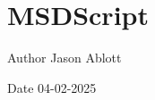 \chapter{MSDScript}
\hypertarget{index}{}\label{index}
\begin{DoxyAuthor}{Author}
Jason Ablott 
\end{DoxyAuthor}
\begin{DoxyDate}{Date}
04-\/02-\/2025 
\end{DoxyDate}
